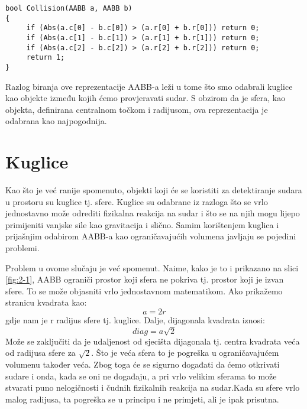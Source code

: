 \begin{lstlisting}[style={myC++},label={code:6},caption={Provjeravanje sudara za centar-radijus reprezentaciju AABB-a\cite{1}}]
bool Collision(AABB a, AABB b)
{
	 if (Abs(a.c[0] - b.c[0]) > (a.r[0] + b.r[0])) return 0;
	 if (Abs(a.c[1] - b.c[1]) > (a.r[1] + b.r[1])) return 0;
	 if (Abs(a.c[2] - b.c[2]) > (a.r[2] + b.r[2])) return 0;
	 return 1;
}
\end{lstlisting}

Razlog biranja ove reprezentacije AABB-a leži u tome što smo odabrali kuglice kao objekte između kojih ćemo provjeravati sudar. S obzirom da je sfera, kao objekta, definirana centralnom točkom i radijusom, ova reprezentacija je odabrana kao najpogodnija.

\section{Kuglice}\label{sec:balls}

Kao što je već ranije spomenuto, objekti koji će se koristiti za detektiranje sudara u prostoru su kuglice tj. sfere. Kuglice su odabrane iz razloga što se vrlo jednostavno može odrediti fizikalna reakcija na sudar i što se na njih mogu lijepo primijeniti vanjske sile kao gravitacija i slično. Samim korištenjem kuglica i prijašnjim odabirom AABB-a kao ograničavajućih volumena javljaju se pojedini problemi.

Problem u ovome slučaju je već spomenut. Naime, kako je to i prikazano na slici \ref{fig:2-1}, AABB ograniči prostor koji sfera ne pokriva tj. prostor koji je izvan sfere. To se može objasniti vrlo jednostavnom matematikom. Ako prikažemo stranicu kvadrata kao:
\begin{equation}
a = 2r \label{eq:stranica}
\end{equation}
gdje nam je r radijus sfere tj. kuglice. Dalje, dijagonala kvadrata iznosi:
\begin{equation}
diag = a  \sqrt{2} \label{eq:dijagonala}
\end{equation}
Može se zaključiti da je udaljenost od sjecišta dijagonala tj. centra kvadrata veća od radijusa sfere za $\sqrt{2}$. Što je veća sfera to je pogreška u ograničavajućem volumenu također veća. Zbog toga će se sigurno događati da ćemo otkrivati sudare i onda, kada se oni ne događaju, a pri vrlo velikim sferama to može stvarati puno nelogičnosti i čudnih fizikalnih reakcija na sudar.Kada su sfere vrlo malog radijusa, ta pogreška se u principu i ne primjeti, ali je ipak prisutna.

